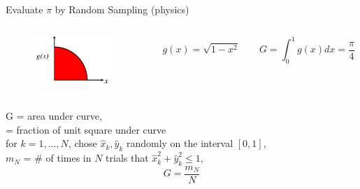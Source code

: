 \documentclass[xcolor=x11names,compress, handout]{beamer}
\renewcommand{\(}{\begin{columns}}
\renewcommand{\)}{\end{columns}}
\newcommand{\<}[1]{\begin{column}{#1}}
\renewcommand{\>}{\end{column}}
\begin{document}
\begin{frame}{Evaluate $\pi$ by Random Sampling (physics)}

\begin{columns}
  \begin{column}{0.3\textwidth}
  	\begin{figure}
  	\begin{center}
  		\includegraphics[height=0.75in,clip]{quarter-circle}
	\end{center}
  	\end{figure}
  \end{column}
  \begin{column}{0.7\textwidth}
    \begin{equation}
      g(x) = \sqrt{1 - x^2}	\qquad G = \int_0^1 g(x)dx = \frac{\pi}{4} \nonumber
    \end{equation}
  \end{column}
\end{columns}
\pause
\vspace*{0.5em}
G = area under curve, \\
\hspace*{0.75 em} = fraction of unit square under curve\\
\vspace*{0.5em}
\hspace*{2 em}for $k = 1, \dots, N$, chose $\hat{x}_k, \hat{y}_k$ randomly on the interval $[0,1]$,\\
\vspace*{0.5em}
$m_N$ = $\#$ of times in $N$ trials that $\hat{x}_k^2 + \hat{y}_k^2 \leq 1$,
\[G = \frac{m_N}{N}\]

\end{frame}
\end{document}
